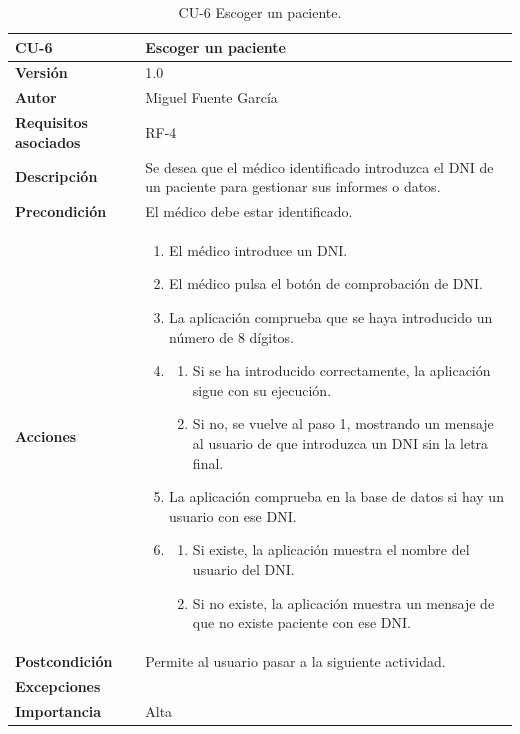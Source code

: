 \begin{table}[p]
	\centering
	\begin{tabularx}{\linewidth}{ p{} p{} }
		\toprule
		\textbf{CU-6}    & \textbf{Escoger un paciente}\\
		\toprule
		\textbf{Versión}              & 1.0    \\
		\textbf{Autor}                & Miguel Fuente García \\
		\textbf{Requisitos asociados} & RF-4  \\
		\textbf{Descripción}          & Se desea que el médico identificado introduzca el DNI de un paciente para gestionar sus informes o datos. \\
		\textbf{Precondición}         & El médico debe estar identificado. \\
		\textbf{Acciones}             &
		\begin{enumerate}
			\def\labelenumi{\arabic{enumi}.}
			\tightlist
			\item El médico introduce un DNI.
            \item El médico pulsa el botón de comprobación de DNI.
            \item La aplicación comprueba que se haya introducido un número de 8 dígitos.
            \item \begin{enumerate}
                \def\labelenumi{\arabic{enumi}.}
    			\tightlist
                \item Si se ha introducido correctamente, la aplicación sigue con su ejecución.
                \item Si no, se vuelve al paso 1, mostrando un mensaje al usuario de que introduzca un DNI sin la letra final.
            \end{enumerate}
            \item La aplicación comprueba en la base de datos si hay un usuario con ese DNI.
            \item \begin{enumerate}
                \def\labelenumi{\arabic{enumi}.}
    			\tightlist
                \item Si existe, la aplicación muestra el nombre del usuario del DNI.
                \item Si no existe, la aplicación muestra un mensaje de que no existe paciente con ese DNI.
            \end{enumerate}
		\end{enumerate}\\
		\textbf{Postcondición}        & Permite al usuario pasar a la siguiente actividad. \\
		\textbf{Excepciones}          &  \\
		\textbf{Importancia}          & Alta  \\
		\bottomrule
	\end{tabularx}
	\caption{CU-6 Escoger un paciente.}
\end{table}


